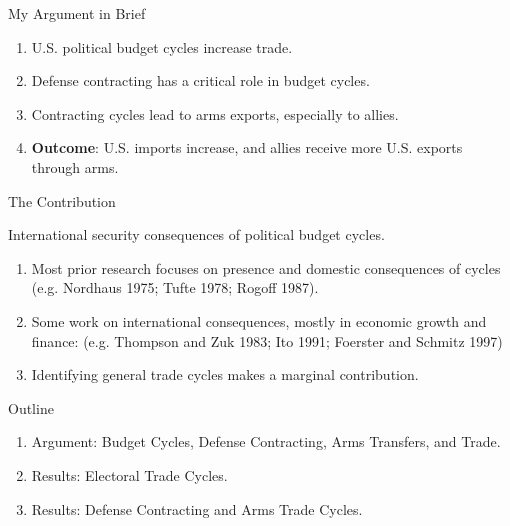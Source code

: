 \documentclass[12pt]{beamer}
\begin{document}

\begin{frame}{My Argument in Brief}

\begin{enumerate}
\item U.S. political budget cycles increase trade.  
\pause 
\item Defense contracting has a critical role in budget cycles.
\pause 
\item Contracting cycles lead to arms exports, especially to allies. 
\pause
\item \textbf{Outcome}: U.S. imports increase, and allies receive more U.S. exports through arms. 
\end{enumerate}

\end{frame}



\begin{frame}{The Contribution}


International security consequences of political budget cycles.  
\pause 
\begin{enumerate}
\item Most prior research focuses on presence and domestic consequences of cycles (e.g. Nordhaus 1975; Tufte 1978; Rogoff 1987). 
\pause 
\item Some work on international consequences, mostly in economic growth and finance: (e.g. Thompson and Zuk 1983; Ito 1991; Foerster and Schmitz 1997)
\pause 
\item Identifying general trade cycles makes a marginal contribution. 
\end{enumerate}

\end{frame}



\begin{frame}{Outline}

\pause
\begin{enumerate}
\item Argument: Budget Cycles, Defense Contracting, Arms Transfers, and Trade. 
\pause
\item Results: Electoral Trade Cycles. 
\pause
\item Results: Defense Contracting and Arms Trade Cycles.  
\end{enumerate}


\end{frame}
 
\end{document}
